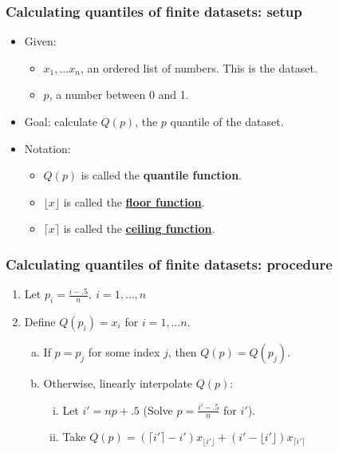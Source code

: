 \documentclass[handout]{beamer}\usepackage{graphicx, color}
\numberwithin{equation}{section}
\begin{document}
\begin{frame}
\frametitle{Calculating quantiles of finite datasets: setup}

\begin{itemize}
\item Given:
\begin{itemize}
\item $x_1, \ldots x_n$, an ordered list of numbers. This is the dataset.
\pause \item $p$, a number between 0 and 1.
\end{itemize}
\pause \item Goal: calculate $Q(p)$, the $p$ quantile of the dataset.
\pause \item Notation:
\begin{itemize}
 \item $Q(p)$ is called the {\bf quantile function}.
\pause \item $\lfloor x \rfloor$ is called the {\bf \href{http://en.wikipedia.org/wiki/Floor\_and\_ceiling\_functions}{floor function}}. 
\pause \item $\lceil x \rceil$ is called the {\bf \href{http://en.wikipedia.org/wiki/Floor\_and\_ceiling\_functions}{ceiling function}}. 
\end{itemize}

\end{itemize}
\end{frame}




\begin{frame}
\frametitle{Calculating quantiles of finite datasets: procedure}
\begin{enumerate}[1. ]
\item Let $p_i = \frac{i-.5}{n}, \ i = 1, \ldots, n$ 
\pause \item Define $Q(p_i) = x_i $ for $i = 1, \ldots n$.
\begin{enumerate}[a. ]
\pause \item If $p = p_j$ for some index $j$, then $Q(p) = Q(p_j)$.
\pause \item Otherwise, linearly interpolate $Q(p)$:
\begin{enumerate}[i. ]
\pause \item Let $i' = np+.5$ (Solve $p = \frac{i'-.5}{n}$ for $i'$).
\pause \item Take $Q(p) = (\lceil i' \rceil -i')x_{\lfloor i' \rfloor} + (i'-\lfloor i' \rfloor)x_{\lceil i' \rceil}$ 
\end{enumerate}
\end{enumerate}
\end{enumerate}
\end{frame}
\end{document}
